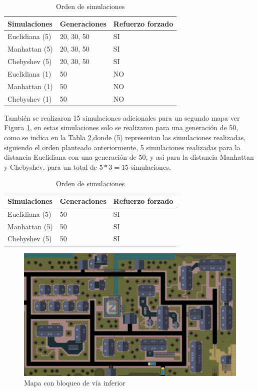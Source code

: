 \documentclass[lettersize, journal]{IEEEtran}
\begin{document}
\begin{table}
\centering
\caption{Orden de simulaciones}
\label{tab:fds_1}
\begin{tabular}{lll}
\toprule
\textbf{Simulaciones} & 
\textbf{Generaciones}  &
\textbf{Refuerzo forzado}\\
\midrule
Euclidiana (5)   &  20, 30, 50 & SI\\
Manhattan (5)     &  20, 30, 50 & SI\\
Chebyshev (5)     &  20, 30, 50 & SI\\
\bottomrule
Euclidiana (1)    & 50 & NO\\
Manhattan (1)     & 50 & NO\\
Chebyshev  (1)    & 50 & NO\\
\bottomrule
\end{tabular}
\end{table}

También se realizaron 15 simulaciones adicionales para un segundo mapa ver Figura \ref{fig:mapa2}, en estas simulaciones solo se realizaron para una generación de 50, como se indica en la Tabla \ref{tab:fds_2},donde (5) representan las simulaciones realizadas, siguiendo el orden planteado anteriormente, 5 simulaciones realizadas para la distancia Euclidiana con una generación de 50, y así para la distancia Manhattan y Chebyshev, para un total de $5*3=15$ simulaciones.

\begin{table}
\centering
\caption{Orden de simulaciones}
\label{tab:fds_2}
\begin{tabular}{lll}
\toprule
\textbf{Simulaciones} & 
\textbf{Generaciones}  &
\textbf{Refuerzo forzado}\\
\midrule
Euclidiana (5)   &50 & SI\\
Manhattan (5)     &50 & SI\\
Chebyshev (5)     &50 & SI\\
\bottomrule
\end{tabular}
\end{table}


\begin{figure}
    \centering    \includegraphics[width=0.8\linewidth]{Simulacion/gta.png}
    \caption{Mapa con bloqueo de vía inferior}
    \label{fig:mapa2}
\end{figure}
\end{document}
